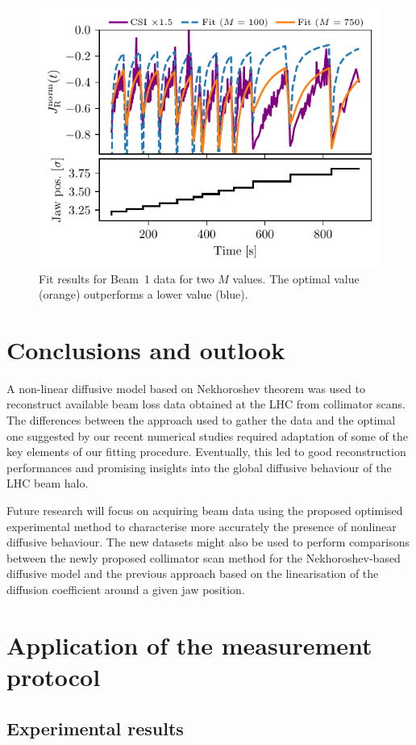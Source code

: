 \begin{figure}[htb]
    \centering
    \includegraphics[trim={0 2.5mm 0 3mm}, clip, width=0.95\columnwidth]{5_Diffusion_measurement_LHC/figs/fifth.pdf}
    \caption{Fit results for Beam~1 data for two $M$ values. The optimal value (orange) outperforms a lower value (blue).}
    \label{fig:fifth}
\end{figure}
%
\section{Conclusions and outlook}
%
A non-linear diffusive model based on Nekhoroshev theorem was used to reconstruct available beam loss data obtained at the  LHC from collimator scans. The differences between the approach used to gather the data and the optimal one suggested by our recent numerical studies required adaptation of some of the key elements of our fitting procedure. Eventually, this led to good reconstruction performances and promising insights into the global diffusive behaviour of the LHC beam halo.

Future research will focus on acquiring beam data using the proposed optimised experimental method to characterise more accurately the presence of nonlinear diffusive behaviour. The new datasets might also be used to perform comparisons between the newly proposed collimator scan method for the Nekhoroshev-based diffusive model and the previous approach based on the linearisation of the diffusion coefficient around a given jaw position.

\section{Application of the measurement protocol}

\subsection{Experimental results}

